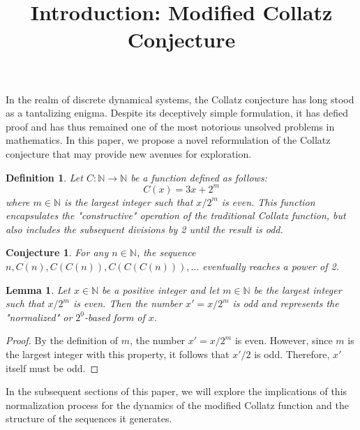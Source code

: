 \documentclass{article}
\newtheorem{definition}{Definition}[section]
\newtheorem{conjecture}{Conjecture}[section]
\newtheorem{lemma}{Lemma}[section]
\begin{document}
\title{Introduction: Modified Collatz Conjecture}
\maketitle

In the realm of discrete dynamical systems, the Collatz conjecture has long stood as a tantalizing enigma. Despite its deceptively simple formulation, it has defied proof and has thus remained one of the most notorious unsolved problems in mathematics. In this paper, we propose a novel reformulation of the Collatz conjecture that may provide new avenues for exploration.

\begin{definition}
Let \(C: \mathbb{N} \rightarrow \mathbb{N}\) be a function defined as follows:
\[
C(x) = 3x + 2^m
\]
where \(m \in \mathbb{N}\) is the largest integer such that \(x/2^m\) is even. This function encapsulates the "constructive" operation of the traditional Collatz function, but also includes the subsequent divisions by 2 until the result is odd.
\end{definition}

\begin{conjecture}
For any \(n \in \mathbb{N}\), the sequence \(n, C(n), C(C(n)), C(C(C(n))), \ldots\) eventually reaches a power of 2.
\end{conjecture}

\begin{lemma}
Let \(x \in \mathbb{N}\) be a positive integer and let \(m \in \mathbb{N}\) be the largest integer such that \(x/2^m\) is even. Then the number \(x' = x / 2^m\) is odd and represents the "normalized" or \(2^0\)-based form of \(x\).
\end{lemma}

\begin{proof}
By the definition of \(m\), the number \(x' = x / 2^m\) is even. However, since \(m\) is the largest integer with this property, it follows that \(x' / 2\) is odd. Therefore, \(x'\) itself must be odd.
\end{proof}

In the subsequent sections of this paper, we will explore the implications of this normalization process for the dynamics of the modified Collatz function and the structure of the sequences it generates.
\end{document}
